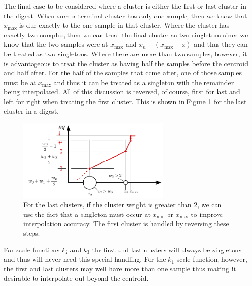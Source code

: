\documentclass[11pt]{amsart}
\begin{document}
The final case to be considered where a cluster is either the first or last cluster in the digest. 
When such a terminal cluster has only one sample, then we know that $x_{\mathrm {max}}$ is due exactly to the one sample in that cluster. Where the cluster has exactly two samples, then we can treat the final cluster as two singletons since we know that the two samples were at $x_{\mathrm {max}}$ and $x_n-(x_{\mathrm {max}}-x)$ and thus they can be treated as two singletons. Where there are more than two samples, however, it is advantageous to treat the cluster as having half the samples before the centroid and half after. For the half of the samples that come after, one of those samples must be at $x_{\mathrm {max}}$ and thus it can be treated as a singleton with the remainder being interpolated. All of this discussion is reversed, of course, first for last and left for right when treating the first cluster. This is shown in Figure \ref{fig:endpoint} for the last cluster in a digest.
\begin{figure}[htb] %
   \centering
   \includegraphics[width=3in]{quantile-figures/endpoint.pdf} 
   \caption{For the last clusters, if the cluster weight is greater than $2$, we can use the fact that a singleton must occur at $x_{\mathrm {min}}$ or $x_{\mathrm {max}}$ to improve interpolation accuracy. The first cluster is handled by reversing these steps.}
   \label{fig:endpoint}
\end{figure}

For scale functions $k_2$ and $k_3$ the first and last clusters will always be singletons and thus will never need this special handling. For the $k_1$ scale function, however, the first and last clusters may well have more than one sample thus making it desirable to interpolate out beyond the centroid. 
\end{document}
